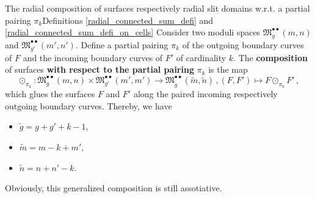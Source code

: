 \begin{defi}
\label{composition_with_pairing}
 {The radial composition of surfaces respectively radial slit domains w.r.t. a partial pairing $\pi_k$}{Definitions \ref{radial_connected_sum_defi} and \ref{radial_connected_sum_defi_on_cells}}
    Consider two moduli spaces $\mathfrak{M}^{\bullet \bullet}_g(m, n)$ and $\mathfrak{M}^{\bullet \bullet}_{g'}({m'}, {n'})$.
    Define a partial pairing $\pi_k$ of the outgoing boundary curves of $F$ and the incoming boundary curves of $F'$ of cardinality $k$.
    The \textbf{composition} of surfaces \textbf{with respect to the partial pairing} $\pi_k$ is the map
   \[
      \odot_{\pi_k} \colon \mathfrak{M}^{\bullet \bullet}_{g}(m, n) \times \mathfrak{M}^{\bullet \bullet}_{g'}(m', m') \to \mathfrak{M}^{\bullet \bullet}_{\tilde g}(\tilde m, \tilde n)\,, (F, F') \mapsto F \odot_{\pi_k} F'\,,
   \]
   which glues the surfaces $F$ and $F'$ along the paired incoming respectively outgoing boundary curves.
   Thereby, we have
   \begin{itemize}
      \item $\tilde g = g + g' + k - 1$,
      \item $\tilde m = m - k + m'$,
      \item $\tilde n = n + n' - k$.
   \end{itemize}
\end{defi}

Obviously, this generalized composition is still assotiative.